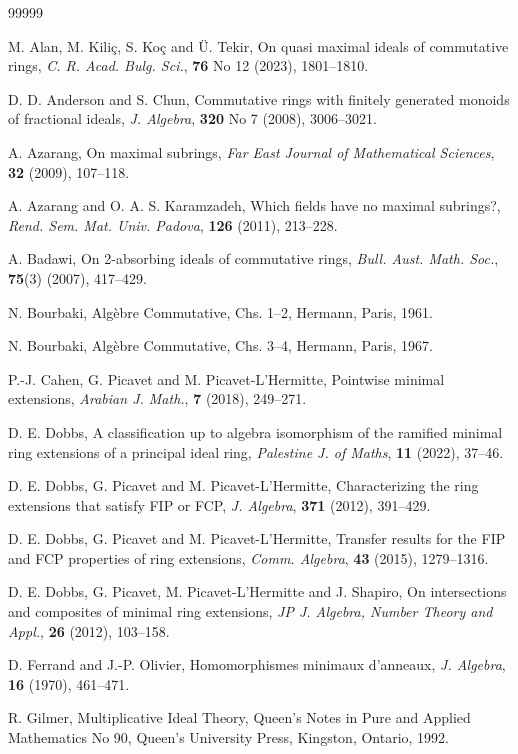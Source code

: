 \documentclass[12pt,leqno]{amsart}
\theoremstyle{definition}
\begin{document}
\begin{thebibliography}{99999}

 M. Alan, M. Kili\c c, S. Ko\c c and \"U. Tekir, On quasi maximal ideals of commutative rings, {\it  C. R. Acad. Bulg. Sci.}, {\bf 76}  No 12   (2023),  1801--1810.

 D. D. Anderson and S. Chun, Commutative rings with finitely generated monoids of fractional ideals, {\it J. Algebra}, {\bf 320} No 7 (2008), 3006--3021.

 A. Azarang, On maximal subrings, {\it Far East Journal of Mathematical Sciences}, {\bf 32} (2009), 107--118.

 A. Azarang and O. A. S. Karamzadeh, Which fields have no maximal subrings?, {\it Rend. Sem. Mat. Univ. Padova}, {\bf 126} (2011), 213--228.

 A. Badawi, On 2-absorbing ideals of commutative rings, {\it Bull. Aust.  Math. Soc.}, {\bf 75}(3) (2007), 417--429.

 N. Bourbaki, Alg\`ebre Commutative, Chs. 1--2, Hermann, Paris, 1961.

 N. Bourbaki, Alg\`ebre Commutative, Chs. 3--4, Hermann, Paris, 1967.

  P.-J. Cahen, G. Picavet and M. Picavet-L'Hermitte, Pointwise minimal extensions, {\it Arabian J. Math.}, {\bf 7} (2018), 249--271.

 D. E. Dobbs, A classification up to algebra isomorphism of the ramified minimal ring extensions of a principal ideal ring, {\it Palestine J. of Maths},  {\bf 11} (2022), 37--46.

 D. E. Dobbs, G. Picavet and M. Picavet-L'Hermitte, Characterizing the ring extensions that satisfy FIP or FCP, {\it J. Algebra}, {\bf 371} (2012), 391--429.

 D. E. Dobbs, G. Picavet and M. Picavet-L'Hermitte, Transfer results for the FIP and FCP properties of ring extensions, {\it Comm. Algebra}, {\bf 43} (2015), 1279--1316.

 D. E. Dobbs, G. Picavet, M. Picavet-L'Hermitte and J. Shapiro, On intersections and composites of minimal ring extensions, {\it JP J. Algebra, Number Theory and Appl.}, {\bf 26} (2012), 103--158.

 D. Ferrand and J.-P. Olivier, Homomorphismes minimaux d'anneaux, {\it J. Algebra}, {\bf 16} (1970), 461--471.

 R. Gilmer, Multiplicative Ideal Theory, Queen's Notes in Pure and Applied Mathematics No 90, Queen's University Press, Kingston, Ontario, 1992.


\end{thebibliography}
\end{document}
